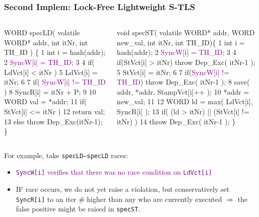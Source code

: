 \documentclass{beamer}
\newcommand{\purple}[1]{\textcolor{Purple}{{#1}}}
\newcommand{\emp}[1]{\textcolor{DikuRed}{ #1}}
\begin{document}
\begin{frame}[fragile,t]
  \frametitle{Second Implem: Lock-Free Lightweight S-TLS}

\begin{columns}
\begin{colorcode}
WORD specLD( volatile WORD* 
addr, int itNr, int TH_ID ) \{ 
1 int i = hash(addr); 
2 \purple{SyncW[i] = TH_ID;} 
3 
4 if( LdVct[i] < itNr )
5     LdVct[i] = itNr; 
6 
7 if( \purple{SyncW[i] != TH_ID} ) 
8   \emp{SyncR[i] = itNr + P;} 
9 
10 WORD val = *addr; 
11 if( StVct[i] <= itNr ) 
12      return val;
13 else throw Dep_Exc(itNr-1);
\} 
\end{colorcode}
\begin{colorcode}
void specST( volatile WORD* addr,
            WORD new_val, int itNr, int TH_ID)\{
1  int i = hash(addr);
2  \purple{SyncW[i] = TH_ID;}
3
4  if(StVct[i] > itNr) throw Dep_Exc( itNr-1 );
5  StVct[i] = itNr;
6
7  if(\purple{SyncW[i] != TH_ID}) \alert{throw Dep_Exc( itNr-1 );}
8  save( addr, *addr, StampVct[i]++ );
10 *addr = new_val;
11
12 WORD ld = \emp{max( LdVct[i], \emp{SyncR[i]} );}
13 if( (\alert{ld > itNr}) || (StVct[i] != itNr) )
14 throw Dep_Exc( itNr-1 ); 
\}
\end{colorcode}
\end{columns}
\medskip\pause

For example, take \emp{\tt specLD--specLD} races:
        \begin{itemize}
            \item \purple{{\tt SyncW[i]} verifies that there was no race condition 
                    on {\tt LdVct[i]}}
            \item \emp{IF race occurs, we do not yet raise a violation,
                    but conservatively set {\tt SyncR[i]} to an iter \#
                    higher than any who are currently executed $\Rightarrow$ the false
                    positive might be raised in {\tt specST}}. 
        \end{itemize}
\end{frame}
\end{document}
